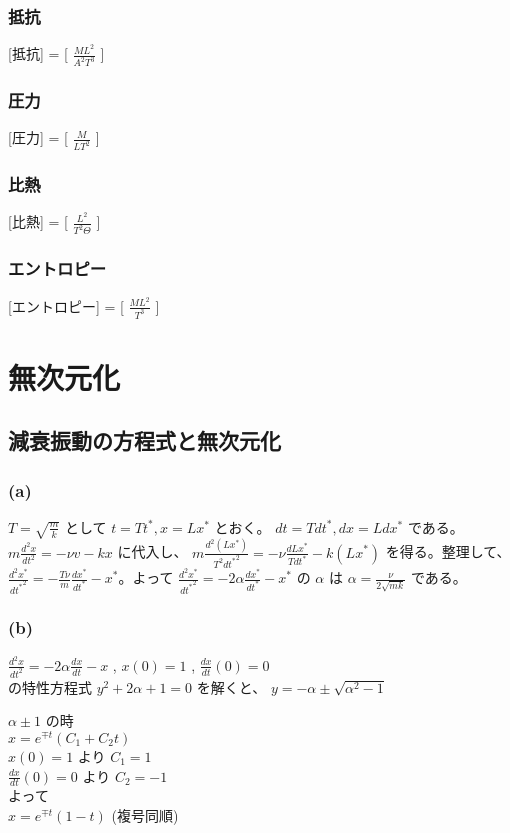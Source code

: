 \documentclass[12pt,a4]{article}
\begin{document}
\subsubsection{抵抗}
[抵抗] = [ $ \frac{ML^2}{A^2T^3} $ ]
\subsubsection{圧力}
[圧力] = [ $ \frac{M}{LT^2} $ ]
\subsubsection{比熱}
[比熱] = [ $ \frac{L^2}{T^2\Theta} $ ]
\subsubsection{エントロピー}
[エントロピー] = [ $ \frac{ML^2}{T^3} $ ]

\section{無次元化}
\subsection{減衰振動の方程式と無次元化}
\subsubsection{(a)}
$ T = \sqrt{\frac{m}{k}} $ として
$ t = T t^*, x = Lx^* $ とおく。
$ dt = T dt^*, dx = L dx^* $ である。
$ m \frac{d^2x}{dt^2} = -\nu v - kx $ に代入し、
$ m \frac{d^2(Lx^*)}{T^2 {dt^*}^2} = -\nu \frac{d Lx^*}{T dt^*} - k(Lx^*) $ を得る。整理して、
$ \frac{d^2x^*}{{dt^*}^2} = - \frac{T\nu}{m} \frac{dx^*}{dt^*} -x^* $。よって
$ \frac{d^2x^*}{{dt^*}^2} = - 2 \alpha \frac{dx^*}{dt^*} - x^* $ の $ \alpha $ は
$ \alpha = \frac{\nu}{2\sqrt{mk}} $ である。

\subsubsection{(b)}
$ \frac{d^2x}{dt^2} = - 2 \alpha \frac{dx}{dt} - x $ , $ x(0) = 1 $ , $ \frac{dx}{dt}(0) = 0 $ \\
の特性方程式 $ y^2 + 2\alpha + 1 = 0 $ を解くと、
$ y = -\alpha \pm \sqrt{\alpha^2-1} $

\medskip
\noindent
$ \alpha \pm 1 $ の時 \\
$ x = e^{\mp t}(C_1 + C_2 t) $ \\
$ x(0) = 1 $ より $ C_1 = 1 $ \\
$ \frac{dx}{dt}(0) = 0 $ より $ C_2 = -1 $ \\
よって \\
$ x = e^{\mp t}(1 - t) $ (複号同順)
\end{document}
